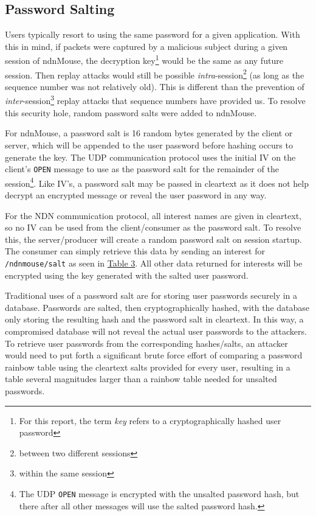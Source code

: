 \documentclass{sig-alternate}
\renewcommand\_{\textunderscore\allowbreak}  %
\begin{document}
\subsection{Password Salting}
Users typically resort to using the same password for a given application. With this in mind, if packets were captured by a malicious subject during a given session of ndnMouse, the decryption key\footnote{For this report, the term \textit{key} refers to a cryptographically hashed user password} would be the same as any future session. Then replay attacks would still be possible \textit{intra}-session\footnote{between two different sessions} (as long as the sequence number was not relatively old). This is different than the prevention of \textit{inter}-session\footnote{within the same session} replay attacks that sequence numbers have provided us. To resolve this security hole, random password salts were added to ndnMouse.

For ndnMouse, a password salt is 16 random bytes generated by the client or server, which will be appended to the user password before hashing occurs to generate the key. The UDP communication protocol uses the initial IV on the client's \texttt{OPEN} message to use as the password salt for the remainder of the session\footnote{The UDP \texttt{OPEN} message is encrypted with the unsalted password hash, but there after all other messages will use the salted password hash.}. Like IV's, a password salt may be passed in cleartext as it does not help decrypt an encrypted message or reveal the user password in any way. 

For the NDN communication protocol, all interest names are given in cleartext, so no IV can be used from the client/consumer as the password salt. To resolve this, the server/producer will create a random password salt on session startup. The consumer can simply retrieve this data by sending an interest for \texttt{/ndnmouse/salt} as seen in \hyperlink{tab:ndnInterestNames}{Table 3}. All other data returned for interests will be encrypted using the key generated with the salted user password.

Traditional uses of a password salt are for storing user passwords securely in a database. Passwords are salted, then cryptographically hashed, with the database only storing the resulting hash and the password salt in cleartext. In this way, a compromised database will not reveal the actual user passwords to the attackers. To retrieve user passwords from the corresponding hashes/salts, an attacker would need to put forth a significant brute force effort of comparing a password rainbow table using the cleartext salts provided for every user, resulting in a table several magnitudes larger than a rainbow table needed for unsalted passwords. 
\end{document}
